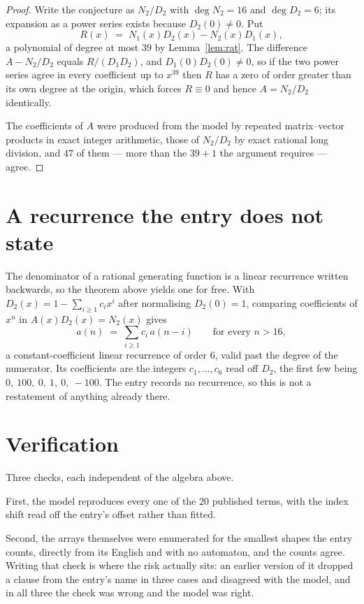 \documentclass[11pt,a4paper]{article}
\theoremstyle{plain}
\theoremstyle{definition}
\begin{document}
\begin{proof}
Write the conjecture as $N_2/D_2$ with $\deg N_2=16$ and $\deg D_2=6$; its expansion as a
power series exists because $D_2(0)\neq0$. Put
\[
R(x)\;=\;N_1(x)D_2(x)-N_2(x)D_1(x),
\]
a polynomial of degree at most $39$ by Lemma~\ref{lem:rat}. The difference
$A-N_2/D_2$ equals $R/(D_1D_2)$, and $D_1(0)D_2(0)\neq0$, so if the two power series agree in
every coefficient up to $x^{39}$ then $R$ has a zero of order greater than its own
degree at the origin, which forces $R\equiv0$ and hence $A=N_2/D_2$ identically.

The coefficients of $A$ were produced from the model by repeated matrix--vector products in
exact integer arithmetic, those of $N_2/D_2$ by exact rational long division, and $47$
of them --- more than the $39+1$ the argument requires --- agree.
\end{proof}

\section{A recurrence the entry does not state}

The denominator of a rational generating function is a linear recurrence written backwards, so
the theorem above yields one for free. With $D_2(x)=1-\sum_{i\ge1}c_ix^i$ after normalising
$D_2(0)=1$, comparing coefficients of $x^n$ in $A(x)D_2(x)=N_2(x)$ gives
\[
a(n)\;=\;\sum_{i\ge1}c_i\,a(n-i)\qquad\text{for every }n>16,
\]
a constant-coefficient linear recurrence of order $6$, valid past the degree of the
numerator. Its coefficients are the integers $c_1,\dots,c_{6}$ read off $D_2$, the first few being $0,\ 100,\ 0,\ 1,\ 0,\ -100$. The entry records no recurrence, so this is not a restatement of anything
already there.

\section{Verification}

Three checks, each independent of the algebra above.

First, the model reproduces every one of the $20$ published terms, with the index shift
read off the entry's offset rather than fitted.

Second, the arrays themselves were enumerated for the smallest shapes the entry counts,
directly from its English and with no automaton, and the counts agree. Writing that check is
where the risk actually sits: an earlier version of it dropped a clause from the entry's name
in three cases and disagreed with the model, and in all three the check was wrong and the model
was right.
\end{document}
